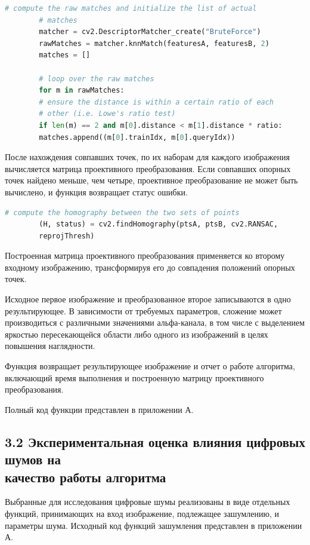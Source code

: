 {{   		\begin{lstlisting}[frame=single,language=Python,mathescape=true] 
   		# compute the raw matches and initialize the list of actual
   		# matches
   		matcher = cv2.DescriptorMatcher_create("BruteForce")
   		rawMatches = matcher.knnMatch(featuresA, featuresB, 2)
   		matches = []
   		
   		# loop over the raw matches
   		for m in rawMatches:
   		# ensure the distance is within a certain ratio of each
   		# other (i.e. Lowe's ratio test)
   		if len(m) == 2 and m[0].distance < m[1].distance * ratio:
   		matches.append((m[0].trainIdx, m[0].queryIdx))
   		\end{lstlisting}
   		
   		После нахождения совпавших точек, по их наборам для каждого изображения вычисляется матрица проективного преобразования.
   		Если совпавших опорных точек найдено меньше, чем четыре, проективное преобразование не может быть вычислено, и функция возвращает статус ошибки.
   		
   		\begin{lstlisting}[frame=single,language=Python,mathescape=true]
   		 # compute the homography between the two sets of points
   		(H, status) = cv2.findHomography(ptsA, ptsB, cv2.RANSAC,
   		reprojThresh)
   		\end{lstlisting}
   		
   		Построенная матрица проективного преобразования применяется ко второму входному изображению, трансформируя его до совпадения положений опорных точек.
   		
   		Исходное первое изображение и преобразованное второе записываются в одно результирующее. В зависимости от требуемых параметров, сложение может производиться с различными значениями альфа-канала, в том числе с выделением яркостью пересекающейся области либо одного из изображений в целях повышения наглядности.
   		
   		Функция возвращает результирующее изображение и отчет о работе алгоритма, включающий время выполнения и построенную матрицу проективного преобразования.
   		
   		Полный код функции представлен в приложении А.
   	}
   
   	\newpage
   	\subsection*{3.2 \quad Экспериментальная оценка влияния цифровых шумов на \\ качество работы алгоритма}{
   		Выбранные для исследования цифровые шумы реализованы в виде отдельных функций, принимающих на вход изображение, подлежащее зашумлению, и параметры шума. Исходный код функций зашумления представлен в приложении А.
   		
}}
